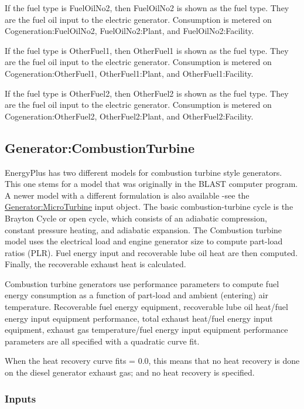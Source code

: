 If the fuel type is FuelOilNo2, then FuelOilNo2 is shown as the fuel type. They are the fuel oil input to the electric generator. Consumption is metered on Cogeneration:FuelOilNo2, FuelOilNo2:Plant, and FuelOilNo2:Facility.

If the fuel type is OtherFuel1, then OtherFuel1 is shown as the fuel type. They are the fuel oil input to the electric generator. Consumption is metered on Cogeneration:OtherFuel1, OtherFuel1:Plant, and OtherFuel1:Facility.

If the fuel type is OtherFuel2, then OtherFuel2 is shown as the fuel type. They are the fuel oil input to the electric generator. Consumption is metered on Cogeneration:OtherFuel2, OtherFuel2:Plant, and OtherFuel2:Facility.

\subsection{Generator:CombustionTurbine}\label{generatorcombustionturbine}

EnergyPlus has two different models for combustion turbine style generators. This one stems for a model that was originally in the BLAST computer program. A newer model with a different formulation is also available -see the \hyperref[generatormicroturbine]{Generator:MicroTurbine} input object. The basic combustion-turbine cycle is the Brayton Cycle or open cycle, which consists of an adiabatic compression, constant pressure heating, and adiabatic expansion. The Combustion turbine model uses the electrical load and engine generator size to compute part-load ratios (PLR). Fuel energy input and recoverable lube oil heat are then computed. Finally, the recoverable exhaust heat is calculated.

Combustion turbine generators use performance parameters to compute fuel energy consumption as a function of part-load and ambient (entering) air temperature. Recoverable fuel energy equipment, recoverable lube oil heat/fuel energy input equipment performance, total exhaust heat/fuel energy input equipment, exhaust gas temperature/fuel energy input equipment performance parameters are all specified with a quadratic curve fit.

When the heat recovery curve fits = 0.0, this means that no heat recovery is done on the diesel generator exhaust gas; and no heat recovery is specified.

\subsubsection{Inputs}\label{inputs-8-005}

